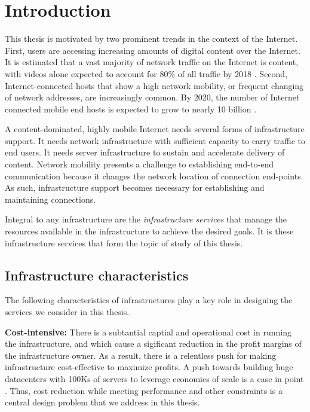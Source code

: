 \chapter{Introduction}

This thesis is motivated by two prominent trends in the context of the Internet. First, users are accessing increasing amounts of digital content over the Internet. It is estimated that a vast majority of network traffic on the Internet is content, with videos alone expected to account for 80\% of all traffic by 2018 \cite{cisco-videogrowth}. Second, Internet-connected hosts that show a high network mobility, or frequent changing of network addresses, are increasingly common. By 2020, the number of Internet connected mobile end hosts is expected to grow to nearly 10 billion \cite{cisco}.


A content-dominated, highly mobile Internet needs several forms of infrastructure support. It needs network infrastructure with sufficient capacity to carry traffic to end users. It needs server infrastructure to sustain and accelerate delivery of content. Network mobility presents a challenge to establishing end-to-end communication because it changes the network location of connection end-points. As such, infrastructure support becomes necessary for establishing and maintaining connections. 


Integral to any infrastructure are the \emph{infrastructure services} that manage the resources available in the infrastructure to achieve the desired goals. It is these infrastructure services that form the topic of study of this thesis.



\section{Infrastructure characteristics}

The following characteristics of infrastructures play a key role in designing the services we consider in this thesis.

\textbf{Cost-intensive:} There is a subtantial captial and operational cost in running the infrastructure\cite{greenberg2008cost}, and which cause a sigificant reduction in the profit margins of the infrastructure owner\cite{isp-low-profit}. As a result, there is a relentless push for making infrastructure cost-effective to maximize profits. 
A push towards building huge datacenters with 100Ks of servers to leverage economies of scale is a case in point \cite{armbrust2010view}. Thus, cost reduction while meeting performance and other constraints is a central design problem that we address in this thesis. 



